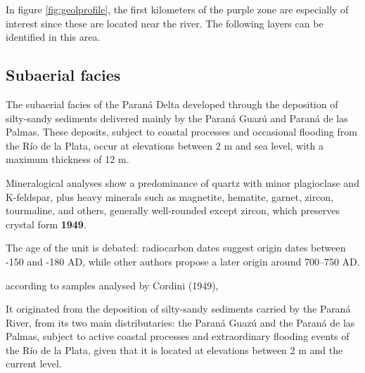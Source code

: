In figure \ref{fig:geolprofile}, the first kilometers of the purple zone are especially of interest since these are located near the river. The following layers can be identified in this area.

\subsection{Subaerial facies}
The subaerial facies of the Paraná Delta developed through the deposition of silty-sandy sediments delivered mainly by the Paraná Guazú and Paraná de las Palmas. These deposits, subject to coastal processes and occasional flooding from the Río de la Plata, occur at elevations between 2 m and sea level, with a maximum thickness of 12 m.

Mineralogical analyses show a predominance of quartz with minor plagioclase and K-feldspar, plus heavy minerals such as magnetite, hematite, garnet, zircon, tourmaline, and others, generally well-rounded except zircon, which preserves crystal form \textbf{1949}.

The age of the unit is debated: radiocarbon dates suggest origin dates between -150 and -180 AD, while other authors propose a later origin around 700–750 AD.




according to samples analysed by Cordini (1949), 

It originated from the deposition
of silty-sandy sediments carried by the Paraná River,
from its two main distributaries: the Paraná Guazú
and the Paraná de las Palmas, subject to active coastal processes
and extraordinary flooding events of the Río de la Plata,
given that it is located at elevations between 2
m and the current level.
